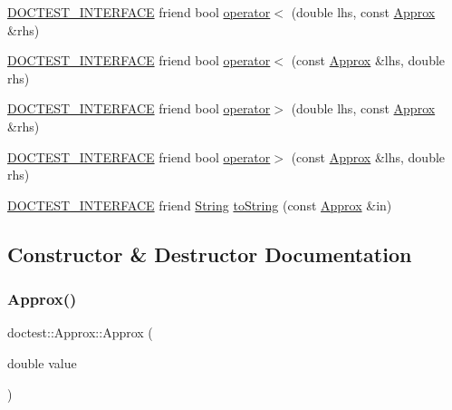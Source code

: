 \begin{DoxyCompactItemize}
\item 
\hyperlink{doctest_8h_a9c16ffc635ec47f07797d21ede26b1a5}{D\+O\+C\+T\+E\+S\+T\+\_\+\+I\+N\+T\+E\+R\+F\+A\+CE} friend bool \hyperlink{classdoctest_1_1_approx_acf32148e34dc6444a3bb4b16e7298279}{operator$<$} (double lhs, const \hyperlink{classdoctest_1_1_approx}{Approx} \&rhs)
\item 
\hyperlink{doctest_8h_a9c16ffc635ec47f07797d21ede26b1a5}{D\+O\+C\+T\+E\+S\+T\+\_\+\+I\+N\+T\+E\+R\+F\+A\+CE} friend bool \hyperlink{classdoctest_1_1_approx_a54ce2536ed164b79688f43e373dcbf7b}{operator$<$} (const \hyperlink{classdoctest_1_1_approx}{Approx} \&lhs, double rhs)
\item 
\hyperlink{doctest_8h_a9c16ffc635ec47f07797d21ede26b1a5}{D\+O\+C\+T\+E\+S\+T\+\_\+\+I\+N\+T\+E\+R\+F\+A\+CE} friend bool \hyperlink{classdoctest_1_1_approx_a97a6e92b9c9dacc0adb2f76f9faf2924}{operator$>$} (double lhs, const \hyperlink{classdoctest_1_1_approx}{Approx} \&rhs)
\item 
\hyperlink{doctest_8h_a9c16ffc635ec47f07797d21ede26b1a5}{D\+O\+C\+T\+E\+S\+T\+\_\+\+I\+N\+T\+E\+R\+F\+A\+CE} friend bool \hyperlink{classdoctest_1_1_approx_a12a93e1726180db4091cb2e3b8ba5e30}{operator$>$} (const \hyperlink{classdoctest_1_1_approx}{Approx} \&lhs, double rhs)
\item 
\hyperlink{doctest_8h_a9c16ffc635ec47f07797d21ede26b1a5}{D\+O\+C\+T\+E\+S\+T\+\_\+\+I\+N\+T\+E\+R\+F\+A\+CE} friend \hyperlink{classdoctest_1_1_string}{String} \hyperlink{classdoctest_1_1_approx_aa1ba324952b7844d35fc569b1c6c139a}{to\+String} (const \hyperlink{classdoctest_1_1_approx}{Approx} \&in)
\end{DoxyCompactItemize}


\subsection{Constructor \& Destructor Documentation}
\mbox{\label{classdoctest_1_1_approx_a86f0d1b44c1cf095697f23ccdab00802}} 
\subsubsection{\texorpdfstring{Approx()}{Approx()}}
{\footnotesize\ttfamily doctest\+::\+Approx\+::\+Approx (\begin{DoxyParamCaption}\item[{double}]{value }\end{DoxyParamCaption})\hspace{0.3cm}{\ttfamily [explicit]}}



